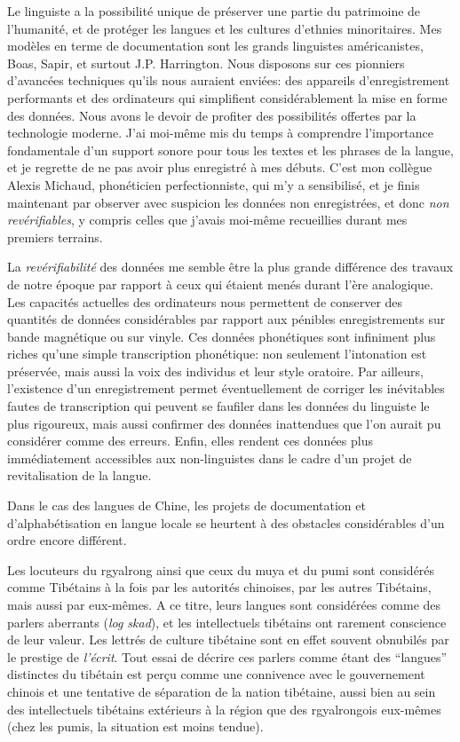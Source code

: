 \documentclass[oldfontcommands,oneside,a4paper,11pt]{memoir}
\begin{document}
 Le linguiste a  la possibilité unique de préserver une partie du patrimoine de l'humanité, et de protéger les langues et les cultures d'ethnies minoritaires. 
Mes modèles en terme de documentation sont les grands linguistes américanistes, Boas, Sapir, et surtout J.P. Harrington.   Nous disposons  sur ces pionniers d'avancées techniques qu'ils nous auraient enviées:  des appareils d'enregistrement performants et des ordinateurs qui simplifient considérablement la mise en forme des données. Nous avons le devoir de profiter des possibilités offertes par la technologie moderne. J'ai moi-même mis du temps à comprendre l'importance fondamentale d'un support sonore pour tous les textes et les phrases de la langue, et je regrette de ne pas avoir plus enregistré à mes débuts. C'est mon collègue Alexis Michaud, phonéticien perfectionniste, qui m'y a sensibilisé, et je finis maintenant par observer avec suspicion les données non enregistrées, et donc \textit{non revérifiables}, y compris celles que j'avais moi-même recueillies durant mes premiers terrains. 


La \textit{revérifiabilité} des données me semble être la plus grande différence des travaux de notre époque par rapport à ceux qui étaient menés durant l'ère analogique. Les capacités actuelles des ordinateurs nous permettent de conserver des quantités de données considérables par rapport aux pénibles enregistrements sur bande magnétique ou sur vinyle. Ces données phonétiques sont infiniment plus riches qu'une simple transcription phonétique: non seulement l'intonation est préservée, mais aussi la voix des individus et leur style oratoire. Par ailleurs, l'existence d'un enregistrement permet éventuellement de corriger les inévitables fautes de transcription qui peuvent se faufiler dans les données  du linguiste le plus rigoureux, mais aussi confirmer des données inattendues que l'on aurait pu considérer comme des erreurs. Enfin, elles rendent ces données plus immédiatement accessibles aux non-linguistes dans le cadre d'un projet de revitalisation de la langue.




Dans le cas des langues de Chine, les projets de documentation et d'alphabétisation en langue locale se heurtent à des obstacles considérables d'un ordre encore différent.

Les locuteurs du rgyalrong ainsi que ceux du muya et du pumi sont considérés comme Tibétains à la fois par les autorités chinoises, par les autres Tibétains, mais aussi par eux-mêmes. A ce titre, leurs langues sont considérées comme des parlers aberrants (\textit{log skad}), et les intellectuels tibétains ont rarement conscience de leur valeur. Les lettrés de culture tibétaine sont en effet souvent obnubilés par le prestige de \textit{l'écrit}. Tout essai de décrire ces parlers comme étant des ``langues'' distinctes du tibétain est perçu comme une connivence avec le gouvernement chinois et une tentative de séparation de la nation tibétaine, aussi bien au sein des intellectuels tibétains extérieurs à la région que des rgyalrongois eux-mêmes (chez les pumis, la situation est moins tendue).
\end{document}
